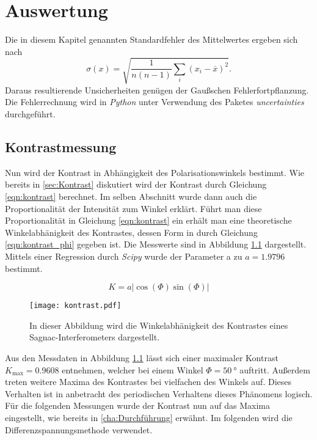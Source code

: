 \chapter{Auswertung}
\label{cha:Auswertung}
Die in diesem Kapitel genannten Standardfehler des Mittelwertes ergeben sich nach
\begin{equation*}
  \label{eqn:MW-Fehler}
  \sigma(x) = \sqrt{\frac{1}{n(n-1)} \sum_i (x_i - \overline{x})^2}.
\end{equation*}
Daraus resultierende Unsicherheiten genügen der Gaußschen Fehlerfortpflanzung.
Die Fehlerrechnung wird in \textit{Python} unter Verwendung des Paketes \textit{uncertainties} \cite{uncertainties} durchgeführt.

\section{Kontrastmessung}
\label{sec:kontrastmessung}
Nun wird der Kontrast in Abhängigkeit des Polarisationswinkels bestimmt. Wie bereits in \autoref{sec:Kontrast} diskutiert wird der Kontrast durch Gleichung \ref{eqn:kontrast} berechnet.
Im selben Abschnitt wurde dann auch die Proportionalität der Intensität zum Winkel erklärt. Führt man diese Proportionalität in Gleichung \ref{eqn:kontrast} ein erhält man eine 
theoretische Winkelabhänigkeit des Kontrastes, dessen Form in durch Gleichung \ref{eqn:kontrast_phi} gegeben ist. Die Messwerte sind in Abbildung \ref{fig:kontrast} dargestellt. Mittels
einer Regression durch \textit{Scipy}\cite{scipy} wurde der Parameter a zu $a = \num{1.9796}$ bestimmt. 

\begin{equation}
  \label{eqn:kontrast_phi}
  K = a\lvert \cos(\Phi)\sin(\Phi)\rvert  
\end{equation}
\begin{figure}
    \centering
    \texttt{[image: kontrast.pdf]}
    \caption{In dieser Abbildung wird die Winkelabhänigkeit des Kontrastes eines Sagnac-Interferometers dargestellt.}
    \label{fig:kontrast}
\end{figure}

Aus den Messdaten in Abbildung \ref{fig:kontrast} lässt sich einer maximaler Kontrast $K_\mathrm{max} = 0.9608$ entnehmen, welcher bei einem Winkel $\Phi = \qty{50}{\degree}$ auftritt.
Außerdem treten weitere Maxima des Kontrastes bei vielfachen des Winkels auf. Dieses Verhalten ist in anbetracht des periodischen Verhaltens dieses Phänomens logisch. 
Für die folgenden Messungen wurde der Kontrast nun auf das Maxima eingestellt, wie bereits in \autoref{cha:Durchführung} erwähnt. Im folgenden wird die Differenzspannungsmethode 
verwendet.


